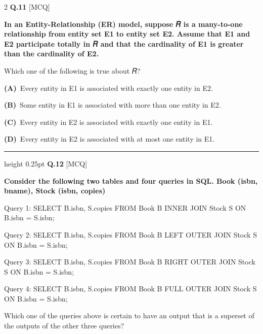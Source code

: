 \documentclass[a4paper,10pt,twoside]{article}
\begin{document}
\begin{multicols}{2}
\noindent\textbf{Q.11} \hfill {\footnotesize\textsf{[MCQ]}}
\par\vspace{2pt}
{\bfseries In an Entity-Relationship (ER) model, suppose 𝑅 is a many-to-one relationship from entity
set E1 to entity set E2. Assume that E1 and E2 participate totally in 𝑅 and that the cardinality
of E1 is greater than the cardinality of E2.
\par\smallskip
Which one of the following is true about 𝑅? \par}
\par\vspace{2pt}\noindent
\textbf{(A)}~Every entity in E1 is associated with exactly one entity in E2.\par\vspace{2pt}\noindent
\textbf{(B)}~Some entity in E1 is associated with more than one entity in E2.\par\vspace{2pt}\noindent
\textbf{(C)}~Every entity in E2 is associated with exactly one entity in E1.\par\vspace{2pt}\noindent
\textbf{(D)}~Every entity in E2 is associated with at most one entity in E1.
\par\vspace{6pt}\hrule height 0.25pt\vspace{6pt}
\noindent\textbf{Q.12} \hfill {\footnotesize\textsf{[MCQ]}}
\par\vspace{2pt}
{\bfseries Consider the following two tables and four queries in SQL.
Book (isbn, bname), Stock (isbn, copies)
\par\smallskip
Query 1: SELECT B.isbn, S.copies
FROM Book B INNER JOIN Stock S
ON B.isbn = S.isbn;
\par\smallskip
Query 2: SELECT B.isbn, S.copies
FROM Book B LEFT OUTER JOIN Stock S
ON B.isbn = S.isbn;
\par\smallskip
Query 3: SELECT B.isbn, S.copies
FROM Book B RIGHT OUTER JOIN Stock S
ON B.isbn = S.isbn;
\par\smallskip
Query 4: SELECT B.isbn, S.copies
FROM Book B FULL OUTER JOIN Stock S
ON B.isbn = S.isbn;
\par\smallskip
Which one of the queries above is certain to have an output that is a superset of the outputs
of the other three queries? \par}
\par\vspace{2pt}\noindent

\end{multicols}
\end{document}
